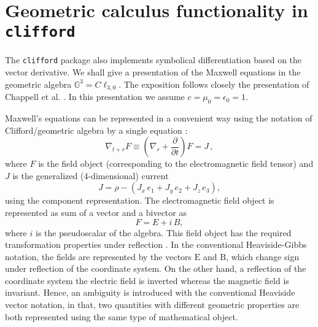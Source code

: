 \documentclass[twoside,reqno,11pt]{amsart}
\theoremstyle{definition}
\theoremstyle{remark}
\numberwithin{equation}{section}
\newcommand{\symb}[1]{{\tt #1}}
\renewcommand{\vec}[1]{\boldsymbol{\mathrm{#1}}}
\newcommand{\mvectdiff}[1]{ \nabla_#1 }
\begin{document}
\section{Geometric calculus functionality in \symb{clifford}}
\label{sec:calculus}

The \symb{clifford} package also implements symbolical differentiation based on the vector derivative. We shall give a presentation of the  Maxwell equations in the geometric algebra $\mathbb{G}^3=C\ell_{3,0}$. The exposition follows closely the presentation of Chappell et al. \cite{Chappell2014}.
In this presentation we assume $c=\mu_0 =\epsilon_0 =1$.

Maxwell's equations can be represented in a convenient way using the notation of Clifford/geometric algebra by a single equation :
\begin{equation}
\nabla_{t+r} F \equiv \left( \mvectdiff{r} +  \frac{\partial }{ \partial t}\right) F = J \, ,
\end{equation}
 where $F$ is the field object (corresponding to the electromagnetic field tensor) and  $J$ is the generalized (4-dimensional) current
\begin{equation}
J =\rho - \left( {{J}_{x}}\, {{e}_{1}}+{{J}_{y}}\, {{e}_{2}}+{{J}_{z}}\, {{e}_{3}}\right),
\end{equation}
using the component representation.
The electromagnetic field object is represented as sum of a vector and a bivector as
\begin{equation}
F = E + i \, B,
\end{equation}
where $i$ is the pseudoscalar of the algebra.
This field object has the required transformation properties under reflection \cite{Chappell2014}.
In the conventional Heaviside-Gibbs notation, the fields are represented by the   vectors $\vec{E}$ and $\vec{B}$, which change sign under reflection of the coordinate system.
On the other hand, a reflection of the coordinate system  the electric field is inverted whereas the magnetic field is invariant.
Hence, an ambiguity is introduced with the conventional Heaviside vector notation, in that, two quantities with different geometric properties are both represented using the same type of mathematical object.
\end{document}
